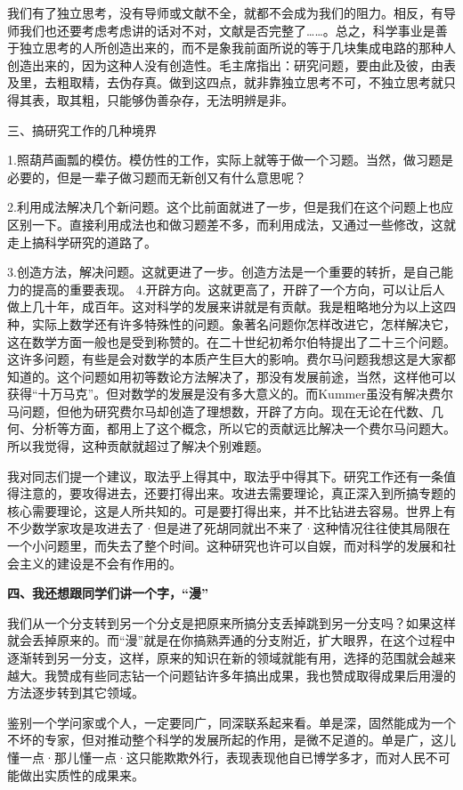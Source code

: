\documentclass[twoside,openright,headings=optiontohead]{ctexbook} %
\begin{document}
{我们有了独立思考，没有导师或文献不全，就都不会成为我们的阻力。相反，有导师我们也还要考虑考虑讲的话对不对，文献是否完整了\ldots{}\ldots{}。总之，科学事业是善于独立思考的人所创造出来的，而不是象我前面所说的等于几块集成电路的那种人创造出来的，因为这种人没有创造性。毛主席指出：研究问题，要由此及彼，由表及里，去粗取精，去伪存真。做到这四点，就非靠独立思考不可，不独立思考就只得其表，取其粗，只能够伪善杂存，无法明辨是非。

三、搞研究工作的几种境界

1.照葫芦画瓢的模仿。模仿性的工作，实际上就等于做一个习题。当然，做习题是必要的，但是一辈子做习题而无新创又有什么意思呢？

2.利用成法解决几个新问题。这个比前面就进了一步，但是我们在这个问题上也应区别一下。直接利用成法也和做习题差不多，而利用成法，又通过一些修改，这就走上搞科学研究的道路了。

3.创造方法，解决问题。这就更进了一步。创造方法是一个重要的转折，是自己能力的提高的重要表现。
4.开辟方向。这就更高了，开辟了一个方向，可以让后人做上几十年，成百年。这对科学的发展来讲就是有贡献。我是粗略地分为以上这四种，实际上数学还有许多特殊性的问题。象著名问题你怎样改进它，怎样解决它，这在数学方面一般也是受到称赞的。在二十世纪初希尔伯特提出了二十三个问题。这许多问题，有些是会对数学的本质产生巨大的影响。费尔马问题我想这是大家都知道的。这个问题如用初等数论方法解决了，那没有发展前途，当然，这样他可以获得``十万马克''。但对数学的发展是没有多大意义的。而Kummer虽没有解决费尔马问题，但他为研究费尔马却创造了理想数，开辟了方向。现在无论在代数、几何、分析等方面，都用上了这个概念，所以它的贡献远比解决一个费尔马问题大。所以我觉得，这种贡献就超过了解决个别难题。

我对同志们提一个建议，取法乎上得其中，取法乎中得其下。研究工作还有一条值得注意的，要攻得进去，还要打得出来。攻进去需要理论，真正深入到所搞专题的核心需要理论，这是人所共知的。可是要打得出来，并不比钻进去容易。世界上有不少数学家攻是攻进去了·但是进了死胡同就出不来了·这种情况往往使其局限在一个小问题里，而失去了整个时间。这种研究也许可以自娱，而对科学的发展和社会主义的建设是不会有作用的。

\textbf{四、我还想跟同学们讲一个字，``漫''}

我们从一个分支转到另一个分攴是把原来所搞分支丢掉跳到另一分支吗？如果这样就会丢掉原来的。而``漫''就是在你搞熟弄通的分支附近，扩大眼界，在这个过程中逐渐转到另一分支，这样，原来的知识在新的领域就能有用，选择的范围就会越来越大。我赞成有些同志钻一个问题钻许多年搞出成果，我也赞成取得成果后用漫的方法逐步转到其它领域。

鉴别一个学问家或个人，一定要同广，同深联系起来看。单是深，固然能成为一个不坏的专家，但对推动整个科学的发展所起的作用，是微不足道的。单是广，这儿懂一点·那儿懂一点·这只能欺欺外行，表现表现他自已博学多才，而对人民不可能做出实质性的成果来。

}
\end{document}
